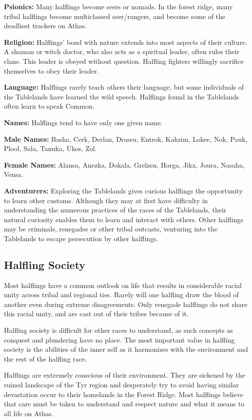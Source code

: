 \documentclass[10pt,a4paper,twocolumn]{d20}
\begin{document}
{\textbf{Psionics:} Many halflings become seers or nomads. In the forest ridge, many tribal halflings become multiclassed seer/rangers, and become some of the deadliest trackers on Athas.

\textbf{Religion:} Halflings’ bond with nature extends into most aspects of their culture. A shaman or witch doctor, who also acts as a spiritual leader, often rules their clans. This leader is obeyed without question. Halfling fighters willingly sacrifice themselves to obey their leader.

\textbf{Language:} Halflings rarely teach others their language, but some individuals of the Tablelands have learned the wild speech. Halflings found in the Tablelands often learn to speak Common.

\textbf{Names:} Halflings tend to have only one given name.

\textbf{Male Names:} Basha, Cerk, Derlan, Drassu, Entrok, Kakzim, Lokee, Nok, Pauk, Plool, Sala, Tanuka, Ukos, Zol.

\textbf{Female Names:} Alansa, Anezka, Dokala, Grelzen, Horga, Jikx, Joura, Nasaha, Vensa.

\textbf{Adventurers:} Exploring the Tablelands gives curious halflings the opportunity to learn other customs. Although they may at first have difficulty in understanding the numerous practices of the races of the Tablelands, their natural curiosity enables them to learn and interact with others. Other halflings may be criminals, renegades or other tribal outcasts, venturing into the Tablelands to escape persecution by other halflings.

\subsection{Halfling Society}
Most halflings have a common outlook on life that results in considerable racial unity across tribal and regional ties. Rarely will one halfling draw the blood of another even during extreme disagreements. Only renegade halflings do not share this racial unity, and are cast out of their tribes because of it.

Halfling society is difficult for other races to understand, as such concepts as conquest and plundering have no place. The most important value in halfling society is the abilities of the inner self as it harmonizes with the environment and the rest of the halfling race.

Halflings are extremely conscious of their environment. They are sickened by the ruined landscape of the Tyr region and desperately try to avoid having similar devastation occur to their homelands in the Forest Ridge. Most halflings believe that care must be taken to understand and respect nature and what it means to all life on Athas.

}
\end{document}
